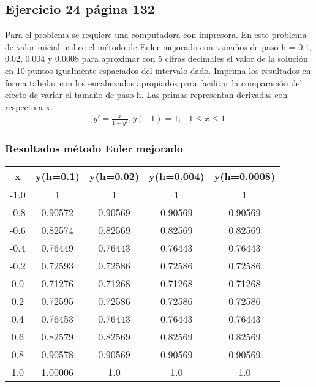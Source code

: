 \documentclass[a4paper.10pt]{article}
\begin{document}
\subsection{Ejercicio 24 p\'agina 132}
Para el problema se requiere una computadora con impresora. En este problema de valor inicial utilice el m\'etodo de Euler mejorado con tama\~nos de paso h = 0.1, 0.02, 0.004 y 0.0008 para aproximar con 5 cifras decimales el valor de la soluci\'on en 10 puntos igualmente espaciados del intervalo dado. Imprima los resultados en forma tabular con los encabezados apropiados para facilitar la comparaci\'on del efecto de variar el tama\~no de paso h. Las primas representan derivadas con respecto a x.
\begin{equation*}
    \begin{aligned}
        y'= \frac{x}{1+y^{2}},y(-1)=1;-1 \leq x \leq 1
    \end{aligned}
\end{equation*}


\subsubsection{Resultados m\'etodo Euler mejorado}

\begin{table}[h]
    \centering
    \begin{tabular}{|c|c|c|c|c|}
        \hline
        x    & y(h=0.1) & y(h=0.02) & y(h=0.004) & y(h=0.0008) \\
        \hline
        -1.0 & 1        & 1         & 1          & 1           \\
        -0.8 & 0.90572  & 0.90569   & 0.90569    & 0.90569     \\
        -0.6 & 0.82574  & 0.82569   & 0.82569    & 0.82569     \\
        -0.4 & 0.76449  & 0.76443   & 0.76443    & 0.76443     \\
        -0.2 & 0.72593  & 0.72586   & 0.72586    & 0.72586     \\
        0.0  & 0.71276  & 0.71268   & 0.71268    & 0.71268     \\
        0.2  & 0.72595  & 0.72586   & 0.72586    & 0.72586     \\
        0.4  & 0.76453  & 0.76443   & 0.76443    & 0.76443     \\
        0.6  & 0.82579  & 0.82569   & 0.82569    & 0.82569     \\
        0.8  & 0.90578  & 0.90569   & 0.90569    & 0.90569     \\
        1.0  & 1.00006  & 1.0       & 1.0        & 1.0         \\
        \hline
    \end{tabular}
\end{table}
\end{document}

